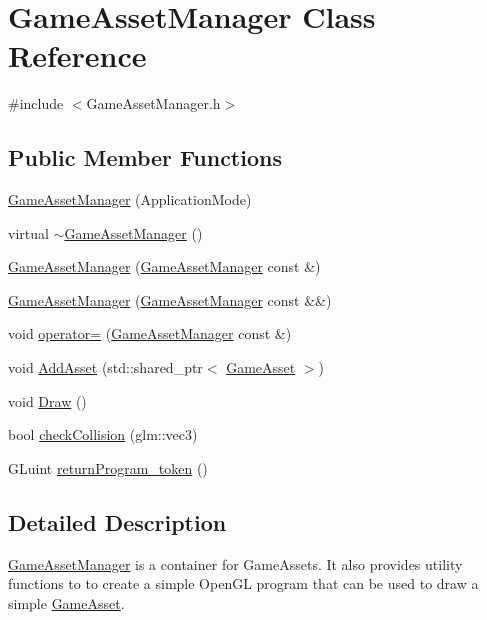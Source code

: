 \hypertarget{classGameAssetManager}{}\section{Game\+Asset\+Manager Class Reference}
\label{classGameAssetManager}


{\ttfamily \#include $<$Game\+Asset\+Manager.\+h$>$}

\subsection*{Public Member Functions}
\begin{DoxyCompactItemize}
\item 
\hyperlink{classGameAssetManager_aaa0d58e276cc10ad91a7457085598a71}{Game\+Asset\+Manager} (Application\+Mode)
\item 
virtual \hyperlink{classGameAssetManager_a1270bd61ecbcca563f079803e40c9b77}{$\sim$\+Game\+Asset\+Manager} ()
\item 
\hyperlink{classGameAssetManager_a2c9adcb72faa154c87eadc9bafe5269d}{Game\+Asset\+Manager} (\hyperlink{classGameAssetManager}{Game\+Asset\+Manager} const \&)
\item 
\hyperlink{classGameAssetManager_a44f6e2fd6b8ff1dd64e5697f1be7386d}{Game\+Asset\+Manager} (\hyperlink{classGameAssetManager}{Game\+Asset\+Manager} const \&\&)
\item 
void \hyperlink{classGameAssetManager_ac72678a4ad5378c685aa6bae84a4e712}{operator=} (\hyperlink{classGameAssetManager}{Game\+Asset\+Manager} const \&)
\item 
void \hyperlink{classGameAssetManager_ad3de8ff00d55ba04728b1de8213b2349}{Add\+Asset} (std\+::shared\+\_\+ptr$<$ \hyperlink{classGameAsset}{Game\+Asset} $>$)
\item 
void \hyperlink{classGameAssetManager_a32837132bd70a9a9ed537323c2d3d886}{Draw} ()
\item 
bool \hyperlink{classGameAssetManager_a6e08b31a22ecb815a8c1fe3a6dd463ed}{check\+Collision} (glm\+::vec3)
\item 
G\+Luint \hyperlink{classGameAssetManager_a80bf9227a397b4aa416388ef94352e29}{return\+Program\+\_\+token} ()
\end{DoxyCompactItemize}


\subsection{Detailed Description}
\hyperlink{classGameAssetManager}{Game\+Asset\+Manager} is a container for Game\+Assets. It also provides utility functions to to create a simple Open\+GL program that can be used to draw a simple \hyperlink{classGameAsset}{Game\+Asset}. 

